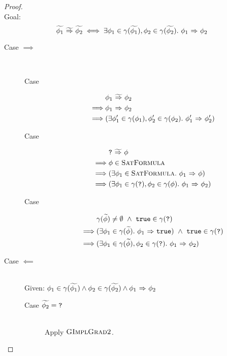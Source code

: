 \begin{proof}~\\
    Goal:
    $${\widetilde{\phi_1}} \,\,{\widetilde{\Rightarrow}}\,\, {\widetilde{\phi_2}} \iff \exists \phi_1 \in \gamma(\widetilde{\phi_1}), \phi_2 \in \gamma(\widetilde{\phi_2}).~ {\phi_1} \,\,{\Rightarrow}\,\, {\phi_2}$$
    
    \begin{description}
        \item[Case $\implies$]~\\
        \begin{description}
            \item[Case ]
            \begin{align*}
            &{\phi_1} \,\,{\widetilde{\Rightarrow}}\,\, {\phi_2}\\
            \implies
            &{\phi_1} \,\,{\Rightarrow}\,\, {\phi_2}\\
            \implies
            &(\exists \phi_1' \in \gamma(\phi_1), \phi_2' \in \gamma(\phi_2).~ {\phi_1'} \,\,{\Rightarrow}\,\, {\phi_2'})
            \end{align*}
            
            \item[Case ]
            \begin{align*}
            &{\textup{\texttt{?}}} \,\,{\widetilde{\Rightarrow}}\,\, {\phi}\\
            \implies
            &\phi \in \textup{\textsc{SatFormula}}\\
            \implies
            &(\exists \phi_1 \in \textup{\textsc{SatFormula}}.~ {\phi_1} \,\,{\Rightarrow}\,\, {\phi})\\
            \implies
            &(\exists \phi_1 \in \gamma(\textup{\texttt{?}}), \phi_2 \in \gamma(\phi).~ {\phi_1} \,\,{\Rightarrow}\,\, {\phi_2})
            \end{align*}
            
            \item[Case ]
            \begin{align*}
            &\gamma(\widetilde{\phi}) \neq \emptyset ~\wedge~ \textup{\texttt{true}} \in \gamma(\textup{\texttt{?}})\\
            \implies
            &(\exists \phi_1 \in \gamma(\widetilde{\phi}).~ {\phi_1} \,\,{\Rightarrow}\,\, {\textup{\texttt{true}}}) ~\wedge~ \textup{\texttt{true}} \in \gamma(\textup{\texttt{?}})\\
            \implies
            &(\exists \phi_1 \in \gamma(\widetilde{\phi}), \phi_2 \in \gamma(\textup{\texttt{?}}).~ {\phi_1} \,\,{\Rightarrow}\,\, {\phi_2})
            \end{align*}
        \end{description}
        \item[Case $\impliedby$]~\\
        Given: $\phi_1 \in \gamma(\widetilde{\phi_1}) \wedge \phi_2 \in \gamma(\widetilde{\phi_2}) \wedge {\phi_1} \,\,{\Rightarrow}\,\, {\phi_2}$
        \begin{description}
            \item[Case $\widetilde{\phi_2} = \textup{\texttt{?}}$]~\\
            Apply $\textup{\textsc{GImplGrad2}}$.
            

\end{description}
\end{description}
\end{proof}
